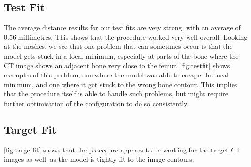 \subsection{Test Fit}
The average distance results for our test fits are very strong, with an average of 0.56 millimetres. This shows that the procedure worked very well overall. Looking at the meshes, we see that one problem that can sometimes occur is that the model gets stuck in a local minimum, especially at parts of the bone where the CT image shows an adjacent bone very close to the femur. \autoref{fig:testfit} shows examples of this problem, one where the model was able to escape the local minimum, and one where it got stuck to the wrong bone contour. This implies that the procedure itself is able to handle such problems, but might require further optimisation of the configuration to do so consistently.

\subsection{Target Fit}
\autoref{fig:targetfit} shows that the procedure appears to be working for the target CT images as well, as the model is tightly fit to the image contours.
